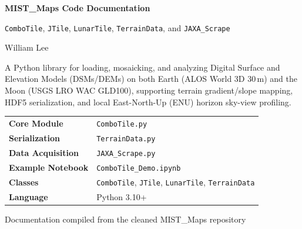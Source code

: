 \documentclass[11pt,letterpaper]{article}
\begin{document}
\begin{titlepage}
  \centering
  \vspace*{1.6cm}
  {\Huge\bfseries\color{navy} MIST\_Maps Code Documentation \par}
  \vspace{0.6cm}
  {\large\color{navy} \texttt{ComboTile}, \texttt{JTile}, \texttt{LunarTile}, \texttt{TerrainData}, and \texttt{JAXA\_Scrape} \par}
  \vspace{0.8cm}
  {\Large William Lee \par}
  \vspace{1.2cm}

  \begin{tcolorbox}[colback=white,colframe=navy,boxrule=1.2pt,width=0.88\textwidth]
    \centering
    A Python library for loading, mosaicking, and analyzing Digital Surface and Elevation Models (DSMs/DEMs) on both Earth (ALOS World 3D 30\,m) and the Moon (USGS LRO WAC GLD100), supporting terrain gradient/slope mapping, HDF5 serialization, and local East-North-Up (ENU) horizon sky-view profiling.
  \end{tcolorbox}

  \vspace{1.6cm}
  \begin{tabular}{@{}ll@{}}
    \toprule
    \textbf{Core Module} & \texttt{ComboTile.py} \\
    \textbf{Serialization} & \texttt{TerrainData.py} \\
    \textbf{Data Acquisition} & \texttt{JAXA\_Scrape.py} \\
    \textbf{Example Notebook} & \texttt{ComboTile\_Demo.ipynb} \\
    \textbf{Classes} & \texttt{ComboTile}, \texttt{JTile}, \texttt{LunarTile}, \texttt{TerrainData} \\
    \textbf{Language} & Python 3.10+ \\
    \bottomrule
  \end{tabular}

  \vfill
  {\small\color{gray} Documentation compiled from the cleaned MIST\_Maps repository \par}
\end{titlepage}

\tableofcontents
\newpage
\end{document}
